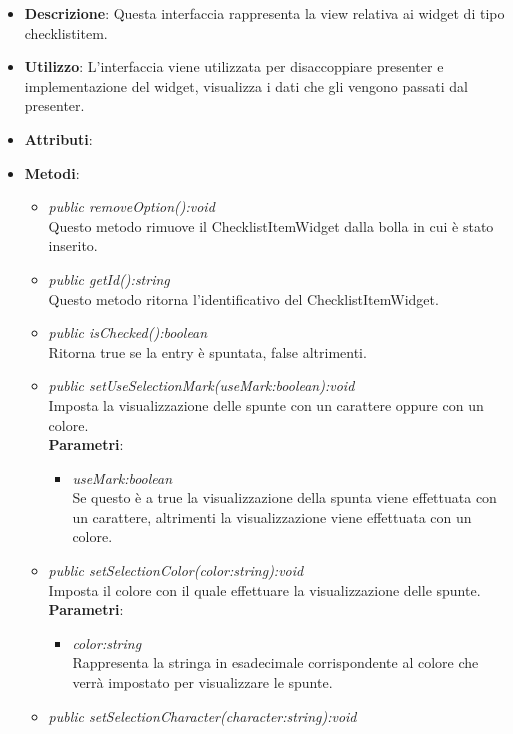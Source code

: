 \begin{itemize}
\item \textbf{Descrizione}: Questa interfaccia rappresenta la view relativa ai widget di tipo checklistitem.
\item \textbf{Utilizzo}: L'interfaccia viene utilizzata per disaccoppiare presenter e implementazione del widget, visualizza i dati che gli vengono passati dal presenter.
\item \textbf{Attributi}:
\item \textbf{Metodi}:
	\begin{itemize}
	\item \textit{public removeOption():void}\\
	Questo metodo rimuove il ChecklistItemWidget dalla bolla in cui è stato inserito.
	\item \textit{public getId():string}\\
	Questo metodo ritorna l'identificativo del ChecklistItemWidget.
	\item \textit{public isChecked():boolean}\\
	Ritorna true se la entry è spuntata, false altrimenti.
	\item \textit{public setUseSelectionMark(useMark:boolean):void}\\
	Imposta la visualizzazione delle spunte con un carattere oppure con un colore.
		\\ \textbf{Parametri}: \begin{itemize}
		\item \textit{useMark:boolean}\\
		Se questo è a true la visualizzazione della spunta viene effettuata con un carattere, altrimenti la visualizzazione viene effettuata con un colore.
		\end{itemize}  
	\item \textit{public setSelectionColor(color:string):void}\\
	Imposta il colore con il quale effettuare la visualizzazione delle spunte.
		\\ \textbf{Parametri}: \begin{itemize}
		\item \textit{color:string}\\
		Rappresenta la stringa in esadecimale corrispondente al colore che verrà impostato per visualizzare le spunte.
		\end{itemize}  
	\item \textit{public setSelectionCharacter(character:string):void}\\

\end{itemize}
\end{itemize}
